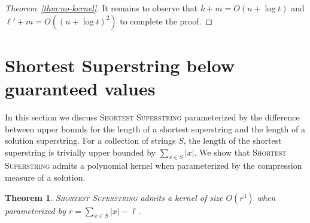 \documentclass[11pt]{article}
\newtheorem{theorem}{Theorem}
\begin{document}
\begin{proof}[Theorem~\ref{thm:no-kernel}]
It remains to observe that $k+m=O(n+\log t)$ and $\ell'+m=O((n+\log t)^2)$ to complete the proof. 
\end{proof}


\section{Shortest Superstring below guaranteed values}\label{sec:below}
In this section we discuss \textsc{Shortest Superstring} parameterized by the difference between upper bounds for the length of a shortest superstring and the length of a solution superstring.  
For a collection of strings $S$, the length of the shortest superstring is trivially upper bounded by $\sum_{x\in S}|x|$. We show that \textsc{Shortest Superstring} admits a polynomial kernel when parameterized by the compression measure of a solution.

\begin{theorem}\label{thm:kernel}
\textsc{Shortest Superstring} admits a kernel of size $O(r^4)$ when parameterized by $r=\sum_{x\in S}|x|-\ell$.
\end{theorem}
\end{document}
